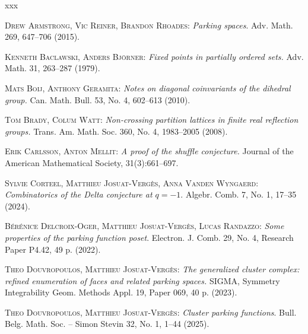 \documentclass[11pt]{article}
\theoremstyle{definition}
\DeclareMathOperator{\Aut}{Aut}
\newcommand{\FFF}{\mathbf{F}}
\newcommand{\RRR}{\mathbf{R}}
\newcommand{\SSS}{\mathbf{S}}
\DeclareMathOperator{\CPF}{CPF}
\begin{document}



\begin{thebibliography}{xxx}

    \textsc{Drew Armstrong, Vic Reiner, Brandon Rhoades}:
    {\it Parking spaces}.
    Adv. Math. 269, 647--706 (2015).

    \textsc{Kenneth Baclawski, Anders Björner}:
    {\it Fixed points in partially ordered sets.}
    Adv. Math. 31, 263--287 (1979).

    \textsc{Mats Boij, Anthony Geramita}:
    {\it Notes on diagonal coinvariants of the dihedral group.}
    Can. Math. Bull. 53, No. 4, 602--613 (2010).

    \textsc{Tom Brady, Colum Watt}:
    {\it Non-crossing partition lattices in finite real reflection groups.}
    Trans. Am. Math. Soc. 360, No. 4, 1983--2005 (2008).

    \textsc{Erik Carlsson, Anton Mellit}:
    {\it A proof of the shuffle conjecture.}
    Journal of the American Mathematical Society, 31(3):661--697.

    \textsc{Sylvie Corteel, Matthieu Josuat-Vergès, Anna Vanden Wyngaerd}:
    {\it Combinatorics of the Delta conjecture at $q=-1$}.
    Algebr. Comb. 7, No. 1, 17--35 (2024).

    \textsc{Bérénice Delcroix-Oger, Matthieu Josuat-Vergès, Lucas Randazzo}:
    {\it Some properties of the parking function poset}.
    Electron. J. Comb. 29, No. 4, Research Paper P4.42, 49 p. (2022).

    \textsc{Theo Douvropoulos, Matthieu Josuat-Vergès}:
    {\it The generalized cluster complex: refined enumeration of faces and related parking spaces.}
    SIGMA, Symmetry Integrability Geom. Methods Appl. 19, Paper 069, 40 p. (2023).

    \textsc{Theo Douvropoulos, Matthieu Josuat-Vergès}:
    {\it Cluster parking functions}.
    Bull. Belg. Math. Soc. -- Simon Stevin 32, No. 1, 1--44 (2025).


\end{thebibliography}
\end{document}
